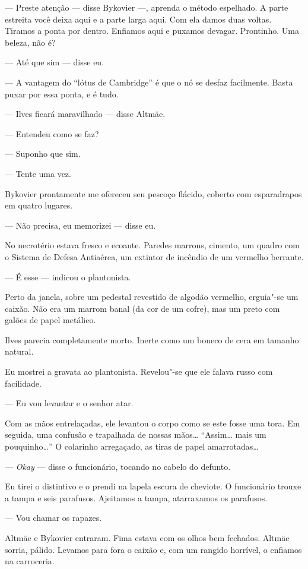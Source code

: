 --- Preste atenção --- disse Bykovier ---, aprenda o método espelhado. A
parte estreita você deixa aqui e a parte larga aqui. Com ela damos duas
voltas. Tiramos a ponta por dentro. Enfiamos aqui e puxamos devagar.
Prontinho. Uma beleza, não é?

--- Até que sim --- disse eu.

--- A vantagem do ``lótus de Cambridge'' é que o nó se desfaz facilmente.
Basta puxar por essa ponta, e é tudo.

--- Ilves ficará maravilhado --- disse Altmäe.

--- Entendeu como se faz?

--- Suponho que sim.

--- Tente uma vez.

Bykovier prontamente me ofereceu seu pescoço flácido, coberto com
esparadrapos em quatro lugares.

--- Não precisa, eu memorizei --- disse eu.

No necrotério estava fresco e ecoante. Paredes marrons, cimento, um
quadro com o Sistema de Defesa Antiaérea, um extintor de incêndio de um
vermelho berrante.

--- É esse --- indicou o plantonista.

Perto da janela, sobre um pedestal revestido de algodão vermelho,
erguia"-se um caixão. Não era um marrom banal (da cor de um cofre), mas
um preto com galões de papel metálico.

Ilves parecia completamente morto. Inerte como um boneco de cera em
tamanho natural.

Eu mostrei a gravata ao plantonista. Revelou"-se que ele falava russo com
facilidade.

--- Eu vou levantar e o senhor atar.

Com as mãos entrelaçadas, ele levantou o corpo como se este fosse uma
tora. Em seguida, uma confusão e trapalhada de nossas mãos\ldots{}
``Assim\ldots{} mais um pouquinho\ldots{}'' O colarinho arregaçado, as tiras de
papel amarrotadas\ldots{}

--- \emph{Okay} --- disse o funcionário, tocando no cabelo do
defunto.

Eu tirei o distintivo e o prendi na lapela escura de cheviote. O
funcionário trouxe a tampa e seis parafusos. Ajeitamos a tampa,
atarraxamos os parafusos.

--- Vou chamar os rapazes.

Altmäe e Bykovier entraram. Fima estava com os olhos bem fechados.
Altmäe sorria, pálido. Levamos para fora o caixão e, com um rangido
horrível, o enfiamos na carroceria.

